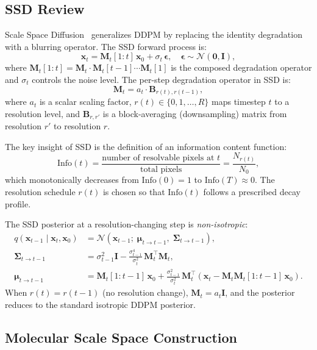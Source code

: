 \documentclass[12pt,a4paper]{article}
\newcommand{\Info}{\mathrm{Info}}
\newcommand{\bx}{\bm{x}}
\newcommand{\bep}{\bm{\epsilon}}
\newcommand{\bmu}{\bm{\mu}}
\newcommand{\bSigma}{\bm{\Sigma}}
\newcommand{\cN}{\mathcal{N}}
\newcommand{\Mt}{\bm{M}_t}
\begin{document}
\subsection{SSD Review}\label{sec:ssd_review}

Scale Space Diffusion~\cite{ssd2026} generalizes DDPM by replacing the identity degradation with a blurring operator. The SSD forward process is:
\begin{equation}\label{eq:ssd_forward}
    \bx_t = \Mt[1:t]\, \bx_0 + \sigma_t\, \bep, \quad \bep \sim \cN(\bm{0}, \bm{I}),
\end{equation}
where $\Mt[1:t] = \Mt \cdot \Mt[t-1] \cdots \Mt[1]$ is the composed degradation operator and $\sigma_t$ controls the noise level. The per-step degradation operator in SSD is:
\begin{equation}\label{eq:ssd_Mt}
    \Mt = a_t \cdot \bm{B}_{r(t), r(t-1)},
\end{equation}
where $a_t$ is a scalar scaling factor, $r(t) \in \{0, 1, \ldots, R\}$ maps timestep $t$ to a resolution level, and $\bm{B}_{r, r'}$ is a block-averaging (downsampling) matrix from resolution $r'$ to resolution $r$.

The key insight of SSD is the definition of an information content function:
\begin{equation}\label{eq:ssd_info}
    \Info(t) = \frac{\text{number of resolvable pixels at } t}{\text{total pixels}} = \frac{N_{r(t)}}{N_0},
\end{equation}
which monotonically decreases from $\Info(0) = 1$ to $\Info(T) \approx 0$. The resolution schedule $r(t)$ is chosen so that $\Info(t)$ follows a prescribed decay profile.

The SSD posterior at a resolution-changing step is \emph{non-isotropic}:
\begin{align}
    q(\bx_{t-1} \mid \bx_t, \bx_0) &= \cN(\bx_{t-1};\; \bmu_{t \to t-1},\; \bSigma_{t \to t-1}), \label{eq:ssd_posterior} \\
    \bSigma_{t \to t-1} &= \sigma_{t-1}^2 \bm{I} - \frac{\sigma_{t-1}^4}{\sigma_t^2}\, \Mt^\top \Mt, \label{eq:ssd_sigma} \\
    \bmu_{t \to t-1} &= \Mt[1:t-1]\, \bx_0 + \frac{\sigma_{t-1}^2}{\sigma_t^2}\, \Mt^\top (\bx_t - \Mt \Mt[1:t-1]\, \bx_0). \label{eq:ssd_mu}
\end{align}
When $r(t) = r(t-1)$ (no resolution change), $\Mt = a_t \bm{I}$, and the posterior reduces to the standard isotropic DDPM posterior.

\subsection{Molecular Scale Space Construction}\label{sec:mol_scalespace}
\end{document}
